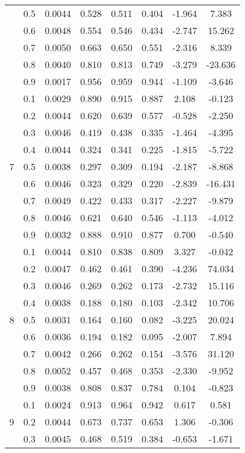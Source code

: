 \documentclass[11pt,a4paper]{report}
\begin{document}
\begin{longtable}{ | c | c || c | c | c | c | c | c | }
 & 0.5 & 0.0044 & 0.528 & 0.511 & 0.404 & -1.964 & 7.383 \\
 & 0.6 & 0.0048 & 0.554 & 0.546 & 0.434 & -2.747 & 15.262 \\
 & 0.7 & 0.0050 & 0.663 & 0.650 & 0.551 & -2.316 & 8.339 \\
 & 0.8 & 0.0040 & 0.810 & 0.813 & 0.749 & -3.279 & -23.636 \\
 & 0.9 & 0.0017 & 0.956 & 0.959 & 0.944 & -1.109 & -3.646 \\
 \hline
\multirow{9}{*}{7} & 0.1 & 0.0029 & 0.890 & 0.915 & 0.887 & 2.108 & -0.123 \\
 & 0.2 & 0.0044 & 0.620 & 0.639 & 0.577 & -0.528 & -2.250 \\
 & 0.3 & 0.0046 & 0.419 & 0.438 & 0.335 & -1.464 & -4.395 \\
 & 0.4 & 0.0044 & 0.324 & 0.341 & 0.225 & -1.815 & -5.722 \\
 & 0.5 & 0.0038 & 0.297 & 0.309 & 0.194 & -2.187 & -8.868 \\
 & 0.6 & 0.0046 & 0.323 & 0.329 & 0.220 & -2.839 & -16.431 \\
 & 0.7 & 0.0049 & 0.422 & 0.433 & 0.317 & -2.227 & -9.879 \\
 & 0.8 & 0.0046 & 0.621 & 0.640 & 0.546 & -1.113 & -4.012 \\
 & 0.9 & 0.0032 & 0.888 & 0.910 & 0.877 & 0.700 & -0.540 \\
 \hline
\multirow{9}{*}{8} & 0.1 & 0.0044 & 0.810 & 0.838 & 0.809 & 3.327 & -0.042 \\
 & 0.2 & 0.0047 & 0.462 & 0.461 & 0.390 & -4.236 & 74.034 \\
 & 0.3 & 0.0046 & 0.269 & 0.262 & 0.173 & -2.732 & 15.116 \\
 & 0.4 & 0.0038 & 0.188 & 0.180 & 0.103 & -2.342 & 10.706 \\
 & 0.5 & 0.0031 & 0.164 & 0.160 & 0.082 & -3.225 & 20.024 \\
 & 0.6 & 0.0036 & 0.194 & 0.182 & 0.095 & -2.007 & 7.894 \\
 & 0.7 & 0.0042 & 0.266 & 0.262 & 0.154 & -3.576 & 31.120 \\
 & 0.8 & 0.0052 & 0.457 & 0.468 & 0.353 & -2.330 & -9.952 \\
 & 0.9 & 0.0038 & 0.808 & 0.837 & 0.784 & 0.104 & -0.823 \\
 \hline
\multirow{9}{*}{9} & 0.1 & 0.0024 & 0.913 & 0.964 & 0.942 & 0.617 & 0.581 \\
 & 0.2 & 0.0044 & 0.673 & 0.737 & 0.653 & 1.306 & -0.306 \\
 & 0.3 & 0.0045 & 0.468 & 0.519 & 0.384 & -0.653 & -1.671 \\

\end{longtable}
\end{document}
